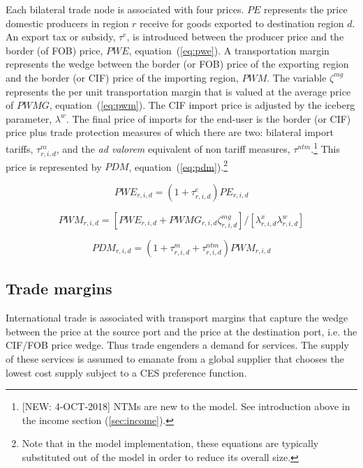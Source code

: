 \documentclass[11pt,letterpaper]{report}
\begin{document}
Each bilateral trade node is associated with four prices. $\mathit{PE}$
represents the price domestic producers in region $r$ receive for goods exported
to destination region $d$. An export tax or subsidy, $\tau^e$, is introduced
between the producer price and the border (of FOB) price, $\mathit{PWE}$,
equation~(\ref{eq:pwe}). A transportation margin represents the wedge between
the border (or FOB) price of the exporting region and the border (or CIF) price
of the importing region, $\mathit{PWM}$. The variable $\zeta^{\mathit{mg}}$
represents the per unit transportation margin that is valued at the average
price of $\mathit{PWMG}$, equation~(\ref{eq:pwm}). The CIF import price is
adjusted by the iceberg parameter, $\lambda^w$. The final price of imports for
the end-user is the border (or CIF) price plus trade protection measures of which there are
two: bilateral import tariffs, $\tau^m_{r,i,d}$, and the \emph{ad valorem} equivalent
of non tariff measures, $\tau^{\mathit{ntm}}$.\footnote{[NEW: 4-OCT-2018] NTMs
are new to the model. See introduction above in the income section (\ref{sec:income}).}
This price is represented by $\mathit{PDM}$,
equation~(\ref{eq:pdm}).\footnote{Note that in the model implementation, these
equations are typically substituted out of the model in order to reduce
its overall size.}

\begin{equation}
\label{eq:pwe}
\mathit{PWE}_{r,i,d} = \left( 1 + \tau^e_{r,i,d} \right) \mathit{PE}_{r,i,d}
\end{equation}

\begin{equation}
\label{eq:pwm}
\mathit{PWM}_{r,i,d} =
\left[
   \mathit{PWE}_{r,i,d} + \mathit{PWMG}_{r,i,d} \zeta^{\mathit{mg}}_{r,i,d}
\right] \bigg/ \left[\lambda^x_{r,i,d} \lambda^w_{r,i,d} \right]
\end{equation}

\begin{equation}
\label{eq:pdm}
\mathit{PDM}_{r,i,d} = \left( 1 + \tau^m_{r,i,d}  + \tau^{\mathit{ntm}}_{r,i,d} \right) \mathit{PWM}_{r,i,d}
\end{equation}

\subsection{Trade margins}

International trade is associated with transport margins that capture the wedge
between the price at the source port and the price at the destination port, i.e.
the CIF/FOB price wedge. Thus trade engenders a demand for services. The supply
of these services is assumed to emanate from a global supplier that chooses the
lowest cost supply subject to a CES preference function.
\end{document}
